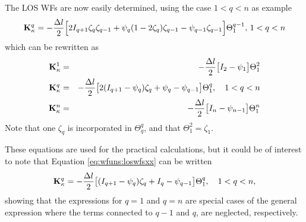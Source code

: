  The LOS WFs are now easily determined, using the case $1<q<n$ as example
 \begin{equation}
   \mathbf{K}_{\kappa}^q = -\frac{\Delta l}{2} \Big[ 2I_{q+1}\zeta_q\zeta_{q-1}+
     \psi_q(1-2\zeta_q)\zeta_{q-1} - \psi_{q-1}\zeta_{q-1} \Big] 
     \Theta^{q-1}_1, \, 1<q<n
 \end{equation}
 which can be rewritten as
 \begin{eqnarray}
   \mathbf{K}_{\kappa}^1 &=& -\frac{\Delta l}{2} \big[ I_2-\psi_1 \big] \Theta^2_1 \nonumber \\
   \mathbf{K}_{\kappa}^q &=& -\frac{\Delta l}{2} \big[ 2(I_{q+1}-\psi_q)\zeta_q+
           \psi_q-\psi_{q-1} \big] \Theta^q_1, \quad 1<q<n 
  \label{eq:wfuns:loswfsxx} \\
   \mathbf{K}_{\kappa}^n &=& -\frac{\Delta l}{2} \big[ I_n-\psi_{n-1} \big] \Theta^n_1 \nonumber
 \end{eqnarray}
 Note that one $\zeta_q$ is incorporated in $\Theta^q_q$, and that 
 $\Theta^2_1=\zeta_1$.
 
 These equations are used for the practical calculations, but it could
 be of interest to note that Equation \ref{eq:wfuns:loswfsxx} can be
 written
 \begin{equation}
   \mathbf{K}_{\kappa}^q = -\frac{\Delta l}{2} \big[ (I_{q+1}-\psi_q)\zeta_q+
           I_q-\psi_{q-1} \big] \Theta^q_1, \quad 1<q<n ,
 \end{equation}
 showing that the expressions for $q=1$ and $q=n$ are special cases of
 the general expression where the terms connected to $q-1$ and $q$,
 are neglected, respectively.
 
